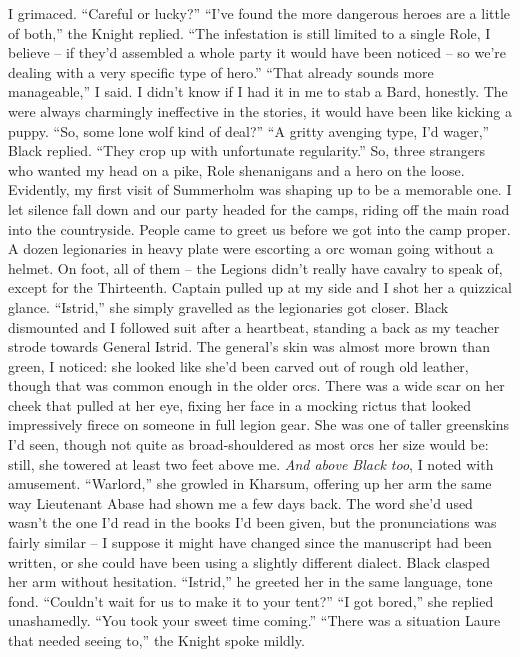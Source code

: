 \documentclass[12pt, openany]{book}
\begin{document}
I grimaced. “Careful or lucky?”
“I’ve found the more dangerous heroes are a little of both,” the Knight replied. “The infestation is still limited to a single Role, I believe – if they’d assembled a whole party it would have been noticed – so we’re dealing with a very specific type of hero.”
“That already sounds more manageable,” I said. I didn’t know if I had it in me to stab a Bard, honestly. The were always charmingly ineffective in the stories, it would have been like kicking a puppy. “So, some lone wolf kind of deal?”
“A gritty avenging type, I’d wager,” Black replied. “They crop up with unfortunate regularity.”
So, three strangers who wanted my head on a pike, Role shenanigans and a hero on the loose. Evidently, my first visit of Summerholm was shaping up to be a memorable one. I let silence fall down and our party headed for the camps, riding off the main road into the countryside.
People came to greet us before we got into the camp proper.
A dozen legionaries in heavy plate were escorting a orc woman going without a helmet. On foot, all of them – the Legions didn’t really have cavalry to speak of, except for the Thirteenth. Captain pulled up at my side and I shot her a quizzical glance.
“Istrid,” she simply gravelled as the legionaries got closer.
Black dismounted and I followed suit after a heartbeat, standing a back as my teacher strode towards General Istrid. The general’s skin was almost more brown than green, I noticed: she looked like she’d been carved out of rough old leather, though that was common enough in the older orcs. There was a wide scar on her cheek that pulled at her eye, fixing her face in a mocking rictus that looked impressively firece on someone in full legion gear. She was one of taller greenskins I’d seen, though not quite as broad-shouldered as most orcs her size would be: still, she towered at least two feet above me. \textit{And above Black too}, I noted with amusement.
“Warlord,” she growled in Kharsum, offering up her arm the same way Lieutenant Abase had shown me a few days back. The word she’d used wasn’t the one I’d read in the books I’d been given, but the pronunciations was fairly similar – I suppose it might have changed since the manuscript had been written, or she could have been using a slightly different dialect. Black clasped her arm without hesitation.
“Istrid,” he greeted her in the same language, tone fond. “Couldn’t wait for us to make it to your tent?”
“I got bored,” she replied unashamedly. “You took your sweet time coming.”
“There was a situation Laure that needed seeing to,” the Knight spoke mildly.
\end{document}
